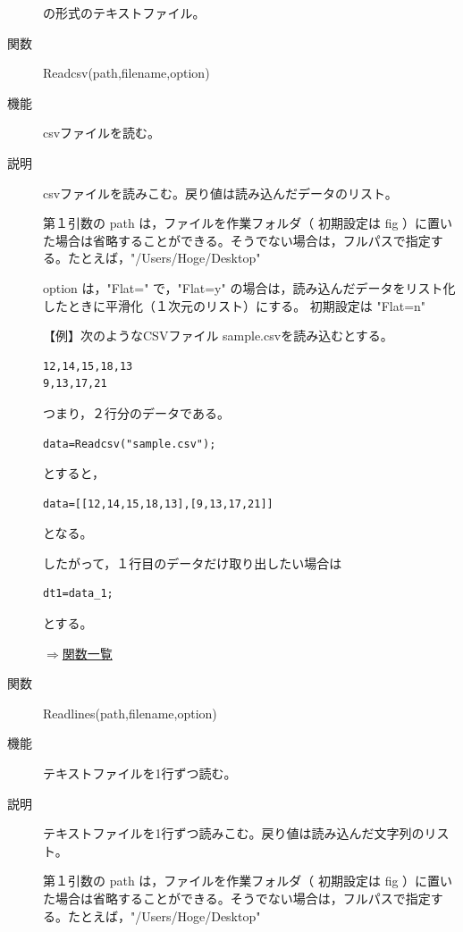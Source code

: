 \documentclass[papersize,a4paper,12pt,uplatex]{jsarticle}
\begin{document}
\begin{description}
の形式のテキストファイル。

\hypertarget{readcsv}{}
\item[関数]Readcsv(path,filename,option)
\item[機能]csvファイルを読む。
\item[説明]csvファイルを読みこむ。戻り値は読み込んだデータのリスト。

第１引数の path は，ファイルを作業フォルダ（ 初期設定は fig ）に置いた場合は省略することができる。そうでない場合は，フルパスで指定する。たとえば，"/Users/Hoge/Desktop"

option は，"Flat=" で，"Flat=y" の場合は，読み込んだデータをリスト化したときに平滑化（１次元のリスト）にする。 初期設定は "Flat=n"

【例】次のようなCSVファイル sample.csvを読み込むとする。

\begin{verbatim}
12,14,15,18,13
9,13,17,21
\end{verbatim}

つまり，２行分のデータである。

\begin{verbatim}
data=Readcsv("sample.csv");
\end{verbatim}

とすると，
\begin{verbatim}
data=[[12,14,15,18,13],[9,13,17,21]]
\end{verbatim}

となる。

したがって，１行目のデータだけ取り出したい場合は

\begin{verbatim}
dt1=data_1;
\end{verbatim}

とする。

\begin{flushright}\hyperlink{functionlist}{$\Rightarrow$関数一覧}\end{flushright}

\hypertarget{readlines}{}
\item[関数]Readlines(path,filename,option)
\item[機能]テキストファイルを1行ずつ読む。
\item[説明]テキストファイルを1行ずつ読みこむ。戻り値は読み込んだ文字列のリスト。

第１引数の path は，ファイルを作業フォルダ（ 初期設定は fig ）に置いた場合は省略することができる。そうでない場合は，フルパスで指定する。たとえば，"/Users/Hoge/Desktop"


\end{description}
\end{document}
